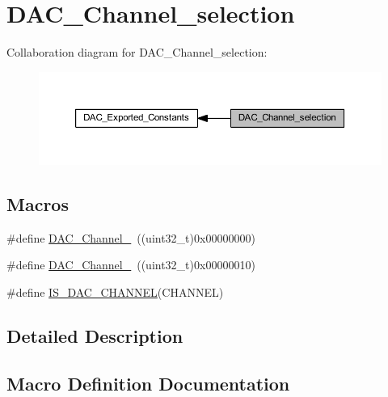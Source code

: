 \hypertarget{group___d_a_c___channel__selection}{}\section{D\+A\+C\+\_\+\+Channel\+\_\+selection}
\label{group___d_a_c___channel__selection}
Collaboration diagram for D\+A\+C\+\_\+\+Channel\+\_\+selection\+:
\nopagebreak
\begin{figure}[H]
\begin{center}
\leavevmode
\includegraphics[width=350pt]{group___d_a_c___channel__selection}
\end{center}
\end{figure}
\subsection*{Macros}
\begin{DoxyCompactItemize}
\item 
\#define \hyperlink{group___d_a_c___channel__selection_gacf6585474ed2a302b69a3725daa91555}{D\+A\+C\+\_\+\+Channel\+\_}~((uint32\+\_\+t)0x00000000)
\item 
\#define \hyperlink{group___d_a_c___channel__selection_ga0e9b0096866bb06e8a82b3e4e66943bb}{D\+A\+C\+\_\+\+Channel\+\_}~((uint32\+\_\+t)0x00000010)
\item 
\#define \hyperlink{group___d_a_c___channel__selection_gafb2b9bdaccb3a5e3396925d7cba02cc3}{I\+S\+\_\+\+D\+A\+C\+\_\+\+C\+H\+A\+N\+N\+EL}(C\+H\+A\+N\+N\+EL)
\end{DoxyCompactItemize}


\subsection{Detailed Description}


\subsection{Macro Definition Documentation}
\mbox{\label{group___d_a_c___channel__selection_gacf6585474ed2a302b69a3725daa91555}} 
